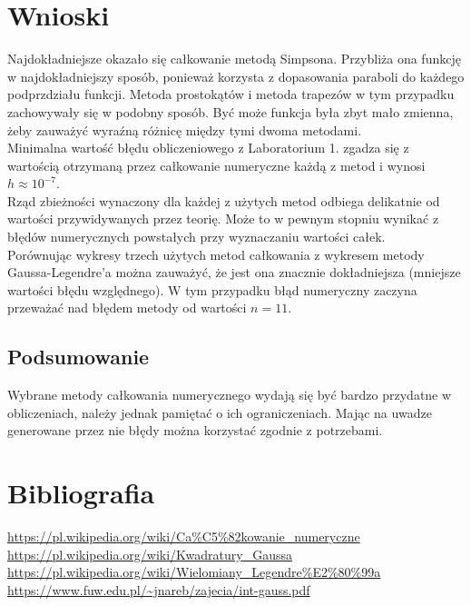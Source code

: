 \documentclass[11pt]{scrartcl}
\begin{document}
    \section{Wnioski}
    Najdokładniejsze okazało się całkowanie metodą Simpsona.
    Przybliża ona funkcję w najdokładniejszy sposób, ponieważ
    korzysta z dopasowania paraboli do każdego podprzdziału
    funkcji. Metoda prostokątów i metoda trapezów w tym przypadku
    zachowywały się w podobny sposób. Być może funkcja była zbyt
    mało zmienna, żeby zauważyć wyraźną różnicę między tymi dwoma
    metodami. \\
    Minimalna wartość błędu obliczeniowego z Laboratorium 1.
    zgadza się z wartością otrzymaną przez całkowanie numeryczne
    każdą z metod i wynosi $h \approx 10^{-7}$. \\
    Rząd zbieżności wynaczony dla każdej z użytych metod odbiega
    delikatnie od wartości przywidywanych przez teorię. Może to
    w pewnym stopniu wynikać z błędów numerycznych powstałych
    przy wyznaczaniu wartości całek. \\
    Porównując wykresy trzech użytych metod całkowania z wykresem
    metody Gaussa-Legendre'a można zauważyć, że jest ona znacznie
    dokładniejsza (mniejsze wartości błędu względnego). W tym
    przypadku błąd numeryczny zaczyna przeważać nad błędem metody
    od wartości $n=11$.
    \subsection*{Podsumowanie}
    Wybrane metody całkowania numerycznego wydają się być bardzo
    przydatne w obliczeniach, należy jednak pamiętać o ich
    ograniczeniach. Mając na uwadze generowane przez nie błędy
    można korzystać zgodnie z potrzebami.

    \section{Bibliografia}
    \url{https://pl.wikipedia.org/wiki/Ca%C5%82kowanie_numeryczne} \\
    \url{https://pl.wikipedia.org/wiki/Kwadratury_Gaussa} \\
    \url{https://pl.wikipedia.org/wiki/Wielomiany_Legendre%E2%80%99a} \\
    \url{https://www.fuw.edu.pl/~jnareb/zajecia/int-gauss.pdf}
\end{document}
